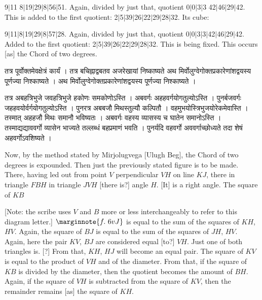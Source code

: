 \documentclass[11pt,a5paper]{book}
\def\danda{$|$}
\begin{document}
{9\danda 11 8\danda 19\danda 29\danda 8\danda 56\danda 51. Again, divided by just that,
quotient 0\danda 0\danda 3\danda 3 42\danda 46\danda 29\danda 42. This is added to the first 
quotient: 2\danda 5\danda 39\danda 26\danda 22\danda 29\danda 28\danda 32. Its cube: 

9\danda 11\danda 8\danda 19\danda 29\danda 8\danda 57\danda 28. Again, divided by just that,
quotient 0\danda 0\danda 3\danda 3\danda 42\danda 46\danda 29\danda 42. 
Added to the first quotient: 2\danda 5\danda 39\danda 26\danda 22\danda 29\danda 28\danda 32.
This is being fixed. This occurs [as] the Chord of two degrees.

\newpage
{\s तत्र पूर्वोक्तमेवक्षेत्रं कार्यं । 
तत्र बचिह्नाद्वबतव अजरेखायां निष्काष्यते अथ मिर्वोलुग्वेगोक्तप्रकारेणांशद्वयस्य पूर्णज्या निश्काष्यते । 
अथ मिर्वोलुग्वेगोक्तप्रकारेणांशद्वयस्य पूर्णज्या निश्काष्यते । 


तत्र अबहत्रिभुजे जवहत्रिभुजे हकोणः समकोणोऽस्ति । अबवर्गः अहहवर्गयोगतुल्योऽस्ति । 
पुनर्बजवर्गः जहहवयोर्वर्गयोगतुल्योऽस्ति । 
पुनरत्र अबबजौ मिथस्तुल्यौ कल्पितौ । वहमुभयोस्त्रिभुजयोरेकमेवास्ति । 
तस्मात् अहहजौ मिथः समानौ भविष्यतः । अबवर्गः वहस्य व्यासस्य च घातेन समानोऽस्ति । 
तस्माद्यद्याववर्गो व्यासेन भाज्यते तल्लब्धं बहप्रमाणं भवति ।
पुनर्यदि वहवर्गो अववर्गाच्छोध्यते तदा शेषं अहवर्गोऽवशिष्यते । }
\newpage
Now, by the method stated by Mirjolugvega [Ulugh Beg], the Chord of two degrees is expounded. 
Then just the previously stated figure is to be made. \\ 

\iffalse
\begin{center}
\texttt{[image: 6r.png]}
\captionof{figure}{6r}
\end{center}
\fi 

There, having led out from point $V$ perpendicular $VH$ on line $KJ$, there in triangle
$FBH$ in triangle $JVH$ [there is?] angle $H$. [It] is a right angle. The square of $KB$ 

[Note: the scribe uses $V$ and $B$ more or less interchangeably to refer to this 
diagram letter.]
$\marginnote{f.~6v J}$
is equal to the sum of the squares of $KH$, $HV$. Again, the square of $BJ$ is equal to the
sum of the squares of $JH$, $HV$. Again, here the pair $KV$, $BJ$ are considered equal 
[to?] $VH$. Just one of both triangles is.  [?] From that, $KH$, $HJ$ will become an equal pair.
The square of $KV$ is equal to the product of $VH$ and of the diameter. From that, if the 
square of $KB$ is divided by the diameter, then the quotient becomes the amount of $BH$.
Again, if the square of $VH$ is subtracted from the square of $KV$, then the remainder
remains [as] the square of $KH$.  

}
\end{document}
